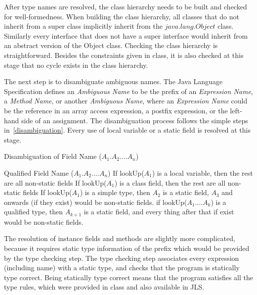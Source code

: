 \documentclass[a4paper, notitlepage]{report}
\begin{document}
After type names are resolved, the class hierarchy needs to be built and checked for well-formedness. When building the class hierarchy, all classes that do not inherit from a super class implicitly inherit from the $java.lang.Object$ class. Similarly every interface that does not have a super interface would inherit from an abstract version of the Object class. Checking the class hierarchy is straightforward. Besides the constraints given in class, it is also checked at this stage that no cycle exists in the class hierarchy.

The next step is to disambiguate ambiguous names. The Java Language Specification defines an \emph{Ambiguous Name} to be the prefix of an \emph{Expression Name}, a \emph{Method Name}, or another \emph{Ambiguous Name}, where an \emph{Expression Name} could be the reference in an array access expression, a postfix expression, or the left-hand side of an assignment. The disambiguation process follows the simple steps in~\ref{disambiguation}. Every use of local variable or a static field is resolved at this stage.

\begin{algorithm}                      %
\caption{Disambiguation of Field Name ($A_1.A_2....A_n$)}          %
\label{disambiguation}                           %
\begin{algorithmic}[1]
\Require Qualified Field Name ($A_1.A_2....A_n$)
\State If lookUp($A_1$) is a local variable, then the rest are all non-static fields 
\State If lookUp($A_1$) is a  class field, then the rest are all non-static fields
\State If lookUp($A_1$) is a simple type, then $A_2$ is a static field, $A_3$ and onwards (if they exist) would be non-static fields.
\State if lookUp($A_1....A_k$) is a qualified type, then $A_{k+1}$ is a static field, and every thing after that if exist would be non-static fields.

\end{algorithmic}
\end{algorithm}

The resolution of instance fields and methods are slightly more complicated, because it requires static type information of the prefix which would be provided by the type checking step. The type checking step associates every expression (including name) with a static type, and checks that the program is statically type correct. Being statically type correct means that the program satisfies all the type rules, which were provided in class and also available in JLS. 
\end{document}
